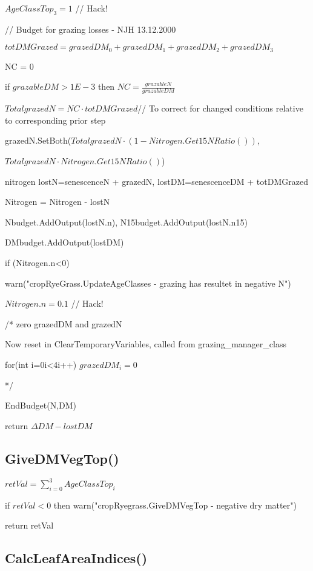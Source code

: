 \documentclass[%
]{scrartcl}
\begin{document}
 \quad       $ AgeClassTop_3=1 $ //  Hack!

   // Budget for grazing losses - NJH 13.12.2000

	$totDMGrazed = grazedDM_0 + grazedDM_1 + grazedDM_2 + grazedDM_3$

   NC = 0

   if $grazableDM>1E-3$ then 
       $ NC = \tfrac{grazableN}{grazableDM}$

  $TotalgrazedN = NC \cdot totDMGrazed $//  To correct for changed conditions relative to corresponding prior step

   grazedN.SetBoth($TotalgrazedN \cdot (1-Nitrogen.Get15NRatio())$,

   \quad  $TotalgrazedN \cdot Nitrogen.Get15NRatio()$)

   nitrogen lostN=senescenceN + grazedN,
   lostDM=senescenceDM + totDMGrazed

   Nitrogen = Nitrogen - lostN

   Nbudget.AddOutput(lostN.n),
   N15budget.AddOutput(lostN.n15)

   DMbudget.AddOutput(lostDM)

   if (Nitrogen.n<0)

 \quad        warn("cropRyeGrass.UpdateAgeClasses - grazing has resultet in negative N")

  \quad      $ Nitrogen.n=0.1 $ //  Hack!

   /* zero grazedDM and grazedN 

   Now reset in ClearTemporaryVariables, called from grazing\_manager\_class

   for(int i=0i<4i++)  $grazedDM_i = 0$

    */

   EndBudget(N,DM)

   return $\Delta DM-lostDM$



\subsection{GiveDMVegTop()}
   $retVal = \sum_{i=0}^3 AgeClassTop_i$

   if $retVal<0$ then
      warn("cropRyegrass.GiveDMVegTop - negative dry matter")

   return retVal

\subsection{CalcLeafAreaIndices()}
\end{document}
